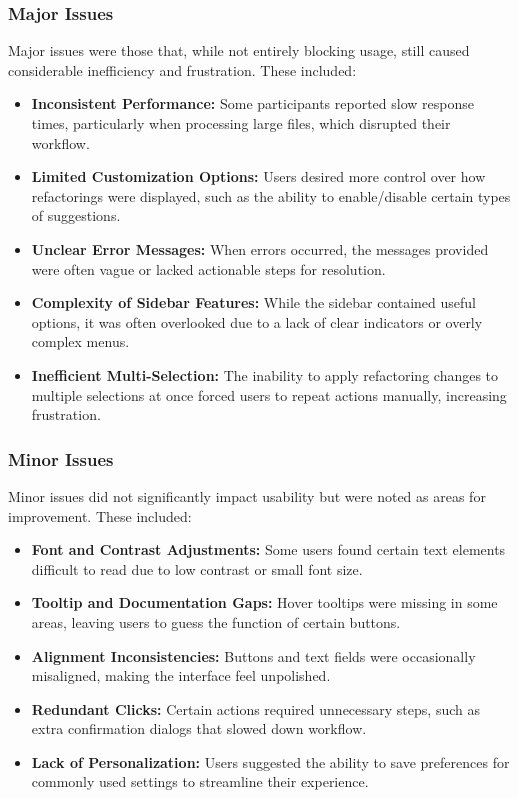 \documentclass{article}
\begin{document}
\subsubsection{Major Issues}
Major issues were those that, while not entirely blocking usage, still caused considerable inefficiency and frustration. These included:
\begin{itemize}
\item \textbf{Inconsistent Performance:} Some participants reported slow response times, particularly when processing large files, which disrupted their workflow.
\item \textbf{Limited Customization Options:} Users desired more control over how refactorings were displayed, such as the ability to enable/disable certain types of suggestions.
\item \textbf{Unclear Error Messages:} When errors occurred, the messages provided were often vague or lacked actionable steps for resolution.
\item \textbf{Complexity of Sidebar Features:} While the sidebar contained useful options, it was often overlooked due to a lack of clear indicators or overly complex menus.
\item \textbf{Inefficient Multi-Selection:} The inability to apply refactoring changes to multiple selections at once forced users to repeat actions manually, increasing frustration.
\end{itemize}

\subsubsection{Minor Issues}
Minor issues did not significantly impact usability but were noted as areas for improvement. These included:
\begin{itemize}
\item \textbf{Font and Contrast Adjustments:} Some users found certain text elements difficult to read due to low contrast or small font size.
\item \textbf{Tooltip and Documentation Gaps:} Hover tooltips were missing in some areas, leaving users to guess the function of certain buttons.
\item \textbf{Alignment Inconsistencies:} Buttons and text fields were occasionally misaligned, making the interface feel unpolished.
\item \textbf{Redundant Clicks:} Certain actions required unnecessary steps, such as extra confirmation dialogs that slowed down workflow.
\item \textbf{Lack of Personalization:} Users suggested the ability to save preferences for commonly used settings to streamline their experience.
\end{itemize}
\end{document}
